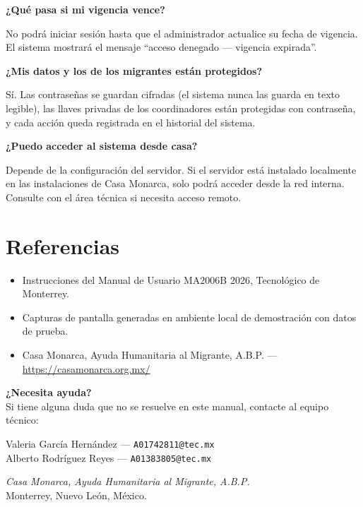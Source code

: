 \documentclass[10pt,letterpaper]{report}
\begin{document}
\textbf{¿Qué pasa si mi vigencia vence?}

No podrá iniciar sesión hasta que el administrador actualice su fecha de vigencia. El sistema mostrará el mensaje ``acceso denegado — vigencia expirada''.

\textbf{¿Mis datos y los de los migrantes están protegidos?}

Sí. Las contraseñas se guardan cifradas (el sistema nunca las guarda en texto legible), las llaves privadas de los coordinadores están protegidas con contraseña, y cada acción queda registrada en el historial del sistema.

\textbf{¿Puedo acceder al sistema desde casa?}

Depende de la configuración del servidor. Si el servidor está instalado localmente en las instalaciones de Casa Monarca, solo podrá acceder desde la red interna. Consulte con el área técnica si necesita acceso remoto.

\chapter{Referencias}

\begin{itemize}
  \item Instrucciones del Manual de Usuario MA2006B 2026, Tecnológico de Monterrey.
  \item Capturas de pantalla generadas en ambiente local de demostración con datos de prueba.
  \item Casa Monarca, Ayuda Humanitaria al Migrante, A.B.P. — \url{https://casamonarca.org.mx/}
\end{itemize}

\vspace{1.5cm}
\begin{center}
\textbf{¿Necesita ayuda?}\\[0.4em]
Si tiene alguna duda que no se resuelve en este manual, contacte al equipo técnico:

\vspace{0.4em}
Valeria García Hernández — \texttt{A01742811@tec.mx}\\
Alberto Rodríguez Reyes — \texttt{A01383805@tec.mx}

\vspace{0.4em}
\textit{Casa Monarca, Ayuda Humanitaria al Migrante, A.B.P.}\\
Monterrey, Nuevo León, México.
\end{center}
\end{document}

